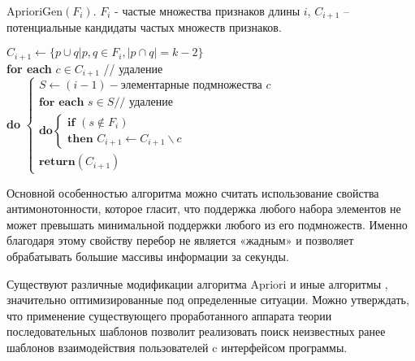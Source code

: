
\newpage
AprioriGen$(F_i)$. $F_i$ - частые множества признаков длины $i$, $C_{i+1}$ -- потенциальные кандидаты частых множеств признаков.

\noindent
$C_{i+1} \leftarrow \{p \cup q | p, q \in F_i,| p \cap q| = k-2 \}$ \\
\textbf{for each} $c \in C_{i+1}$ // удаление \\
\textbf{do}
$\begin{cases}
	S \leftarrow (i-1)-\text{элементарные подмножества } c\\
	\textbf{for each } s \in S \text{// удаление} \\
	\textbf{do} 
	\begin{cases}
		\textbf{if } (s \notin F_i)\\
		\textbf{then } C_{i+1} \leftarrow C_{i+1} \backslash c
	\end{cases} \\
	\textbf{return} (C_{i+1})
\end{cases}$

Основной особенностью алгоритма можно считать использование свойства антимонотонности, которое гласит, что поддержка любого набора элементов не может превышать минимальной поддержки любого из его подмножеств. Именно благодаря этому свойству перебор не является «жадным» и позволяет обрабатывать большие массивы информации за секунды.

Существуют различные модификации алгоритма Apriori и иные алгоритмы \cite{35}, значительно оптимизированные под определенные ситуации. Можно утверждать, что применение существующего проработанного аппарата теории последовательных шаблонов позволит реализовать поиск неизвестных ранее шаблонов взаимодействия пользователей c интерфейсом программы.

